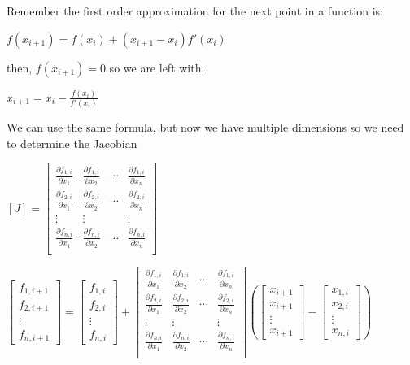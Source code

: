 \documentclass[11pt]{article}
\begin{document}
Remember the first order approximation for the next point in a function
is:

$f(x_{i+1})=f(x_{i})+(x_{i+1}-x_{i})f'(x_{i})$

then, $f(x_{i+1})=0$ so we are left with:

$x_{i+1}=x_{i}-\frac{f(x_{i})}{f'(x_{i})}$

We can use the same formula, but now we have multiple dimensions so we
need to determine the Jacobian

$[J]=\left[ \begin{array}{cccc} \frac{\partial f_{1,i}}{\partial x_{1}} & \frac{\partial f_{1,i}}{\partial x_{2}} & \cdots & \frac{\partial f_{1,i}}{\partial x_{n}} \\ \frac{\partial f_{2,i}}{\partial x_{1}} & \frac{\partial f_{2,i}}{\partial x_{2}} & \cdots & \frac{\partial f_{2,i}}{\partial x_{n}} \\ \vdots & \vdots & & \vdots \\ \frac{\partial f_{n,i}}{\partial x_{1}} & \frac{\partial f_{n,i}}{\partial x_{2}} & \cdots & \frac{\partial f_{n,i}}{\partial x_{n}} \\ \end{array} \right]$

$\left[ \begin{array}{c} f_{1,i+1} \\ f_{2,i+1} \\ \vdots \\ f_{n,i+1}\end{array} \right]= \left[ \begin{array}{c} f_{1,i} \\ f_{2,i} \\ \vdots \\ f_{n,i}\end{array} \right]+ \left[ \begin{array}{cccc} \frac{\partial f_{1,i}}{\partial x_{1}} & \frac{\partial f_{1,i}}{\partial x_{2}} & \cdots & \frac{\partial f_{1,i}}{\partial x_{n}} \\ \frac{\partial f_{2,i}}{\partial x_{1}} & \frac{\partial f_{2,i}}{\partial x_{2}} & \cdots & \frac{\partial f_{2,i}}{\partial x_{n}} \\ \vdots & \vdots & & \vdots \\ \frac{\partial f_{n,i}}{\partial x_{1}} & \frac{\partial f_{n,i}}{\partial x_{2}} & \cdots & \frac{\partial f_{n,i}}{\partial x_{n}} \\ \end{array} \right] \left( \left[ \begin{array}{c} x_{i+1} \\ x_{i+1} \\ \vdots \\ x_{i+1}\end{array} \right]- \left[ \begin{array}{c} x_{1,i} \\ x_{2,i} \\ \vdots \\ x_{n,i}\end{array} \right]\right)$
\end{document}
